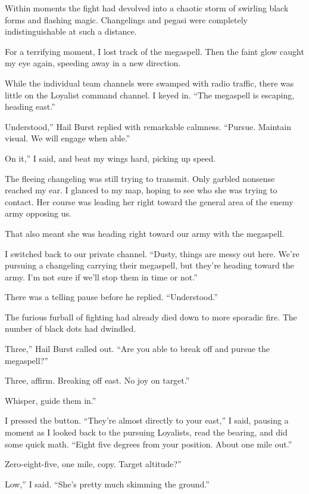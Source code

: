 Within moments the fight had devolved into a chaotic storm of swirling black forms and flashing magic. Changelings and pegasi were completely indistinguishable at such a distance.

For a terrifying moment, I lost track of the megaspell. Then the faint glow caught my eye again, speeding away in a new direction.

While the individual team channels were swamped with radio traffic, there was little on the Loyalist command channel. I keyed in. “The megaspell is escaping, heading east.”

\leavevmode{}Understood,” Hail Burst replied with remarkable calmness. “Pursue. Maintain visual. We will engage when able.”

\leavevmode{}On it,” I said, and beat my wings hard, picking up speed.

The fleeing changeling was still trying to transmit. Only garbled nonsense reached my ear. I glanced to my map, hoping to see who she was trying to contact. Her course was leading her right toward the general area of the enemy army opposing us.

That also meant she was heading right toward our army with the megaspell.

I switched back to our private channel. “Dusty, things are messy out here. We’re pursuing a changeling carrying their megaspell, but they’re heading toward the army. I’m not sure if we’ll stop them in time or not.”

There was a telling pause before he replied. “Understood.”

The furious furball of fighting had already died down to more sporadic fire. The number of black dots had dwindled.

\leavevmode{}Three,” Hail Burst called out. “Are you able to break off and pursue the megaspell?”

\leavevmode{}Three, affirm. Breaking off east. No joy on target.”

\leavevmode{}Whisper, guide them in.”

I pressed the button. “They’re almost directly to your east,” I said, pausing a moment as I looked back to the pursuing Loyalists, read the bearing, and did some quick math. “Eight five degrees from your position. About one mile out.”

\leavevmode{}Zero-eight-five, one mile, copy. Target altitude?”

\leavevmode{}Low,” I said. “She’s pretty much skimming the ground.”

